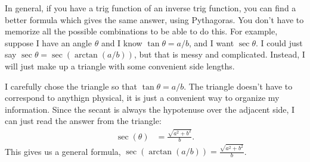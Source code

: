 \documentclass{article}
\begin{document}
In general,  if you have a trig function of an inverse trig function, you can find a better formula which gives the same answer, using Pythagoras. You don't have to memorize all the possible combinations to be able to do this. For example, suppose I have an angle $\theta$ and I know $\tan\theta = a/b$, and I want $\sec\theta$. I could just say $\sec\theta = \sec(\arctan(a/b))$, but that is messy and complicated. Instead, I will just make up a triangle with some convenient side lengths.
\begin{figure}[h!]
\centering
{}
\end{figure}

I carefully chose the triangle so that $\tan\theta=a/b$. The triangle doesn't have to correspond to anythign physical, it is just a convenient way to organize my information. Since the secant is always the hypotenuse over the adjacent side, I can just read the answer from the triangle: 
\begin{align*}
\sec(\theta) &= \frac{\sqrt{a^2+b^2}}{b}.
\end{align*}
This gives us a general formula, $\sec(\arctan(a/b)) = \frac{\sqrt{a^2+b^2}}{b}$. 
\end{document}
